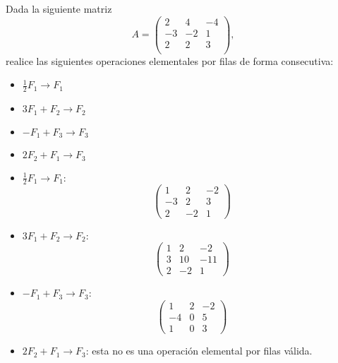 \documentclass[11pt,respuestas,a4]{aleph-examen}
\begin{document}
\begin{preguntas}

\item
    Dada la siguiente matriz
    \[
        A=\begin{pmatrix}
                2 & 4 & -4 \\
                -3 & -2 & 1 \\
                2 & 2 & 3 \\
        \end{pmatrix},
    \]
    realice las siguientes operaciones elementales por filas de forma consecutiva:
    \begin{itemize}
        \item $\frac{1}{2}F_1\rightarrow F_1$ 
        \item $3F_1+F_2\rightarrow F_2$ 
        \item $-F_1+F_3\rightarrow F_3$ 
        \item $2F_2+F_1\rightarrow F_3$ 
    \end{itemize}

\begin{respuesta}
    \begin{itemize}
    \item 
        $\frac{1}{2}F_1\rightarrow F_1$:
        \[
            \begin{pmatrix}1 & 2 & -2\\-3 & 2 & 3\\2 & -2 & 1\end{pmatrix}
        \]
    \item 
        $3F_1+F_2\rightarrow F_2$:
        \[
            \begin{pmatrix}1 & 2 & -2\\3 & 10 & -11\\2 & -2 & 1\end{pmatrix}
        \]
    \item 
        $-F_1+F_3\rightarrow F_3$:
        \[
            \begin{pmatrix}1 & 2 & -2\\-4 & 0 & 5\\1 & 0 & 3\end{pmatrix}
        \]
    \item
        $2F_2+F_1\rightarrow F_3$: esta no es una operación elemental por filas válida.\qedhere
    \end{itemize}
\end{respuesta}


\end{preguntas}
\end{document}
